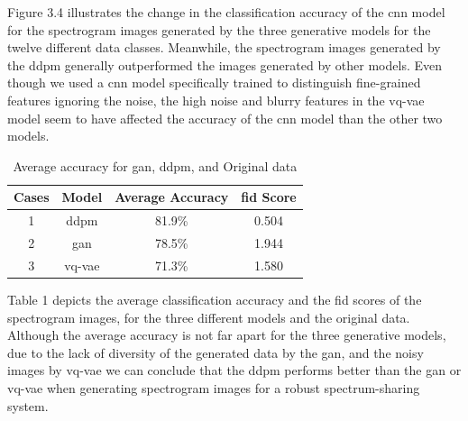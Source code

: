     Figure 3.4 illustrates the change in the classification accuracy of the \gls{cnn} model for the spectrogram images generated by the three generative models for the twelve different data classes. Meanwhile, the spectrogram images generated by the \gls{ddpm} generally outperformed the images generated by other models. Even though we used a \gls{cnn} model specifically trained to distinguish fine-grained features ignoring the noise, the high noise and blurry features in the \gls{vq-vae} model seem to have affected the accuracy of the \gls{cnn} model than the other two models. 
    
    
    \begin{table}[h!]
        \centering
        \begin{tabular}{c c c c}
            \hline
            Cases & Model & Average Accuracy & \gls{fid} Score \\
            \hline
            1 & \gls{ddpm} & 81.9\% & 0.504\\
            \hline
            2 & \gls{gan} & 78.5\% & 1.944\\
            \hline
            3 & \gls{vq-vae} & 71.3\%  & 1.580\\
            \hline
        \end{tabular}
        \caption{Average accuracy for \gls{gan}, \gls{ddpm}, and Original data}
        \label{tab:average_accuracy}
    \end{table}
    
    Table 1 depicts the average classification accuracy and the \gls{fid} scores of the spectrogram images, for the three different models and the original data.
    Although the average accuracy is not far apart for the three generative models, due to the lack of diversity of the generated data by the \gls{gan}, and the noisy images by \gls{vq-vae} we can conclude that the \gls{ddpm} performs better than the \gls{gan} or \gls{vq-vae} when generating spectrogram images for a robust spectrum-sharing system.